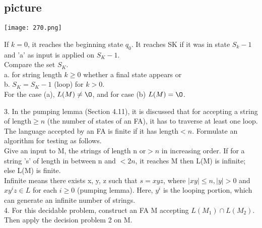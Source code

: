 \documentclass{article}
\begin{document}
\begin{center}
\section{picture}
\texttt{[image: 270.png]}
\end{center}

\hspace*{0.3cm} If $k = 0$, it reaches the beginning state $q_0$. It reaches SK if it was in state $S_k-1$ and 'a' as input is
applied on $S_K-1$.\\
\hspace*{0.3cm} Compare the set $S_K$.\\

\vspace*{0.3cm}
\hspace*{0.5cm} a. for string length $k \geq 0$ whether a final state appears or\\
\hspace*{0.5cm} b. $S_K = S_K-1$ (loop) for $k > 0$.\\

\vspace*{0.3cm}
\hspace*{0.5cm} For the case (a), $L(M) \neq {\O}$, and for case (b) $L(M) = {\O}$.\\

\vspace*{0.3cm}

\textcolor[rgb]{0.00,0.00,1.00}{3}. In the pumping lemma (Section 4.11), it is discussed that for accepting a string of length$ \geq n$ (the
number of states of an FA), it has to traverse at least one loop. The language accepted by an FA is
finite if it has length$ < n$. Formulate an algorithm for testing as follows.\\
Give an input to M, the strings of length n or$ > n$ in increasing order. If for a string 's' of length in
between n and $< 2n$, it reaches M then L(M) is infinite; else L(M) is finite.\\
Infinite means there exists x, y, z such that $s = xyz$, where $| xy | \leq n, | y | >0$ and $xy^iz \in L$ for each $i \geq 0$
(pumping lemma). Here, $y^i$ is the looping portion, which can generate an infinite number of strings.\\

\textcolor[rgb]{0.00,0.00,1.00}{4}. For this decidable problem, construct an FA M accepting $L(M_1) \cap L(M_2)$. Then apply the decision
problem 2 on M.\\
\end{document}
